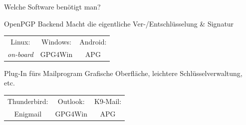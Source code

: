 \begin{frame}{Welche Software benötigt man?}
  \begin{block}{OpenPGP Backend}
    Macht die eigentliche Ver-/Entschlüsselung \& Signatur

    \vspace{1ex}
    \begin{tabular}{ccc}
      Linux:            & Windows: & Android: \\
      \textit{on-board} & GPG4Win  & APG      \\
    \end{tabular}
  \end{block}
  \begin{block}{Plug-In fürs Mailprogram}
    Grafische Oberfläche, leichtere Schlüsselverwaltung, etc.

    \vspace{1ex}
    \begin{tabular}{ccc}
      Thunderbird: & Outlook: & K9-Mail: \\
      Enigmail     & GPG4Win  & APG      \\
    \end{tabular}
  \end{block}
\end{frame}

\endinput
